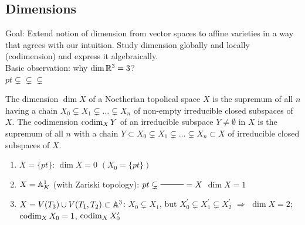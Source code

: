 \documentclass[a4paper,11pt]{article}
\begin{document}
		\subsection{Dimensions}

			\noindent Goal: Extend notion of dimension from vector spaces to affine varieties in a way that agrees with our intuition. Study dimension globally and locally (codimension) and express it algebraically.
			\\

			\noindent Basic observation: why $\dim\R^3=3$?\\
			$pt$\hspace{1cm}$\subsetneq$\hspace{1cm}\hspace{1cm}$\subsetneq$\hspace{1cm}\hspace{1cm}$\subsetneq$\hspace{1cm}	

			\begin{defi}
				The dimension $\dim X$ of a Noetherian topolical space $X$ is the supremum of all $n$ having a chain $X_0\subsetneq X_1\subsetneq\dots\subsetneq X_n$ of non-empty irreducible closed subspaces of $X$. The codimension $\codim_XY$ of an irreducible subspace $Y\neq\emptyset$ in $X$ is the supremum of all $n$ with a chain $Y\subset X_0\subsetneq X_1\subsetneq\dots\subsetneq X_n\subset X$ of irreducible closed subspaces of $X$.
			\end{defi}

			\begin{eg}\label{ex--dimension}
				\begin{enumerate}
					\item $X=\{pt\}$: $\dim X=0$ $(X_0=\{pt\})$
					\item $X=\AA^1_K$ (with Zariski topology): $pt\subsetneq\tikz[baseline=-.1cm]{\draw[thick](-.5,0)--(.5,0)}=X$ $\dim X=1$
					\item $X=V(T_3)\cup V(T_1,T_2)\subset\AA^3$: $X_0\subsetneq X_1$, but $X_0^\prime\subsetneq X_1^\prime\subsetneq X_2^\prime$ $\Longrightarrow$ $\dim X=2$; $\codim_XX_0=1$, $\codim_XX_0^\prime$
					\begin{center}
					\end{center}
				\end{enumerate}
			\end{eg}
\end{document}
